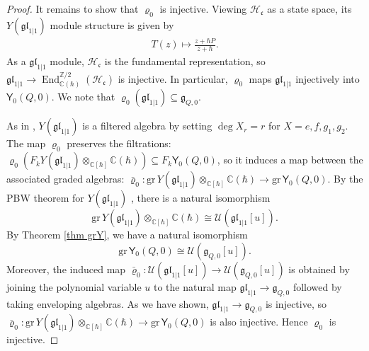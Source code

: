 \documentclass[10pt]{amsart}
\theoremstyle{definition}
\numberwithin{equation}{section}
\newcommand{\bC}{\mathbb{C}}
\newcommand{\bZ}{\mathbb{Z}}
\newcommand{\cH}{\mathcal{H}}
\newcommand{\cU}{\mathcal{U}}
\newcommand{\End}{\operatorname{End}}
\begin{document}
\begin{proof}
It remains to show that $\varrho_0$ is injective.
Viewing $\cH_{\mathfrak{c}}$ as a state space, its $Y(\mathfrak{gl}_{1|1})$ module structure is given by 
\begin{align*}
T(z)\mapsto \frac{z+\hbar P}{z+\hbar}.
\end{align*}
As a $\mathfrak{gl}_{1|1}$ module, $\cH_{\mathfrak{c}}$ is the fundamental representation, so $\mathfrak{gl}_{1|1}\to \End_{\bC(\hbar)}^{\bZ/2}(\cH_{\mathfrak{c}})$ is injective. In particular, $\varrho_0$ maps $\mathfrak{gl}_{1|1}$ injectively into $\mathsf Y_0(Q,0)$. We note that $\varrho_0(\mathfrak{gl}_{1|1})\subseteq \mathfrak{g}_{Q,0}$.

As in \cite[(1.6)]{G}, $Y(\mathfrak{gl}_{1|1})$ is a filtered algebra by setting $\deg X_{r}=r$ for $X=e,f,g_1,g_2$. The map $\varrho_0$ preserves the filtrations: $\varrho_0(F_kY(\mathfrak{gl}_{1|1})\otimes_{\bC[\hbar]}\bC(\hbar))\subseteq F_k\mathsf Y_0(Q,0)$, so it induces a map between the associated graded algebras: $\bar\varrho_0\colon \mathrm{gr}\, Y(\mathfrak{gl}_{1|1})\otimes_{\bC[\hbar]}\bC(\hbar)\to \mathrm{gr}\, \mathsf Y_0(Q,0)$. By the PBW theorem for $Y(\mathfrak{gl}_{1|1})$ \cite[Cor.~2.1]{G}, there is a natural isomorphism $$\mathrm{gr}\, Y(\mathfrak{gl}_{1|1})\otimes_{\bC[\hbar]}\bC(\hbar)\cong \mathcal U(\mathfrak{gl}_{1|1}[u]).$$ By Theorem \ref{thm grY}, we have a natural isomorphism $$\mathrm{gr}\, \mathsf Y_0(Q,0)\cong \mathcal U(\mathfrak{g}_{Q,0}[u]).$$ Moreover, the induced map $\bar\varrho_0\colon \mathcal U(\mathfrak{gl}_{1|1}[u])\to \mathcal U(\mathfrak{g}_{Q,0}[u])$ is obtained by joining the polynomial variable $u$ to the natural map $\mathfrak{gl}_{1|1}\to \mathfrak{g}_{Q,0}$ followed by taking enveloping algebras. As we have shown, $\mathfrak{gl}_{1|1}\to \mathfrak{g}_{Q,0}$ is injective, so $\bar\varrho_0\colon \mathrm{gr}\, Y(\mathfrak{gl}_{1|1})\otimes_{\bC[\hbar]}\bC(\hbar)\to \mathrm{gr}\, \mathsf Y_0(Q,0)$ is also injective. Hence $\varrho_0$ is injective.
\end{proof}

\end{document}
